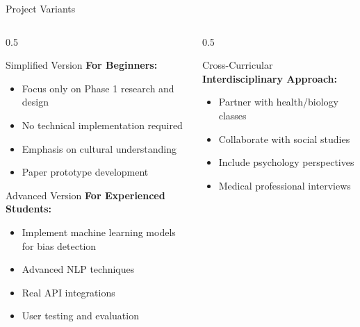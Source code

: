 \documentclass[aspectratio=169]{beamer}
\begin{document}
\begin{frame}{Project Variants}
    \begin{columns}[t]
        \begin{column}{0.5\textwidth}
            \begin{block}{Simplified Version}
                \textbf{For Beginners:}
                \begin{itemize}
                    \item Focus only on Phase 1 research and design
                    \item No technical implementation required
                    \item Emphasis on cultural understanding
                    \item Paper prototype development
                \end{itemize}
            \end{block}
            
            \begin{block}{Advanced Version}
                \textbf{For Experienced Students:}
                \begin{itemize}
                    \item Implement machine learning models for bias detection
                    \item Advanced NLP techniques
                    \item Real API integrations
                    \item User testing and evaluation
                \end{itemize}
            \end{block}
        \end{column}
        \begin{column}{0.5\textwidth}
            \begin{block}{Cross-Curricular}
                \textbf{Interdisciplinary Approach:}
                \begin{itemize}
                    \item Partner with health/biology classes
                    \item Collaborate with social studies
                    \item Include psychology perspectives
                    \item Medical professional interviews
                \end{itemize}
            \end{block}
            

\end{column}
\end{columns}
\end{frame}
\end{document}
